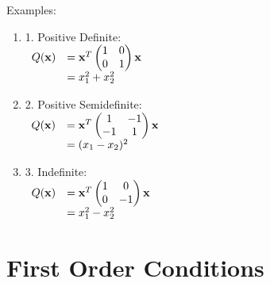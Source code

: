 \documentclass[]{book}
\theoremstyle{definition}
\theoremstyle{definition}
\theoremstyle{definition}
\theoremstyle{remark}
\begin{document}
Examples:

\begin{enumerate}
  \item[] \parbox[c]{2in}{1. Positive Definite:\\
$ \begin{array}{rl}
Q({\bf x}) &={\bf x}^T \begin{pmatrix} 1&0\\0&1\end{pmatrix} {\bf x} \\
         &=x_1^2+x_2^2
\end{array} $ }

\begin{comment}
\parbox{2in}{\texttt{[image: posdef.eps]}}
\end{comment}

  \item[] \parbox[c]{2in}{2. Positive Semidefinite:\\

$ \begin{array}{rl}
Q({\bf x})&={\bf x}^T \begin{pmatrix} 1&-1\\-1&1\end{pmatrix} {\bf x} \\
       &=(x_1-x_2)^2
\end{array} $ }
\begin{comment}
\parbox{2in}{\texttt{[image: possem.eps]}}
\end{comment}

  \item[] \parbox[c]{2in}{3. Indefinite:\\

$ \begin{array}{rl}
Q({\bf x})&={\bf x}^T \begin{pmatrix} 1&0\\0&-1\end{pmatrix} {\bf x} \\
       &=x_1^2-x_2^2
       \end{array} $ }
\begin{comment}
  \parbox{2in}{\texttt{[image: indef.eps]}}
\end{comment}
\end{enumerate}

\section{First Order Conditions}\label{first-order-conditions}
\end{document}
